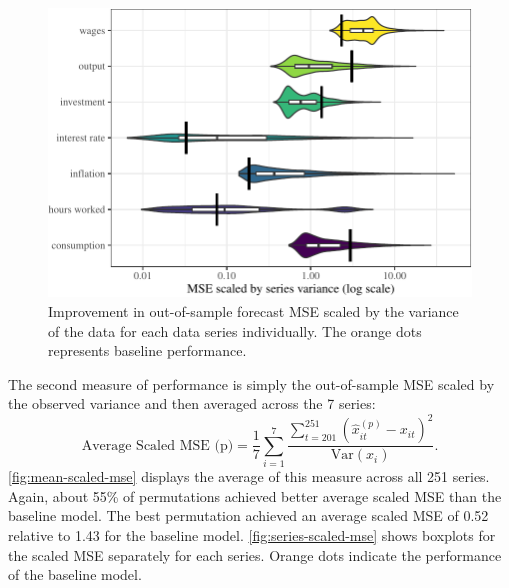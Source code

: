 \documentclass[11pt]{article}
\renewcommand{\hat}{\widehat}
\begin{document}
\begin{figure}[t]

{\centering \includegraphics{gfx/series-scaled-mse-1} 

}

\caption{Improvement in out-of-sample forecast MSE scaled by the variance of the data for each data series individually. The orange dots represents baseline performance.}\label{fig:series-scaled-mse}
\end{figure}

The second measure of performance is simply the out-of-sample MSE scaled
by the observed variance and then averaged across the 7 series:
\begin{equation}
  \mbox{Average Scaled MSE (p)} = \frac{1}{7} \sum_{i=1}^7
  \frac{\sum_{t=201}^{251} (\hat{x}_{it}^{(p)}-x_{it})^2}
    {\mbox{Var}(x_i)}.
\end{equation} \autoref{fig:mean-scaled-mse} displays the average of
this measure across all 251 series. Again, about 55\% of permutations
achieved better average scaled MSE than the baseline model. The best
permutation achieved an average scaled MSE of 0.52 relative to 1.43 for
the baseline model. \autoref{fig:series-scaled-mse} shows boxplots for
the scaled MSE separately for each series. Orange dots indicate the
performance of the baseline model.
\end{document}
